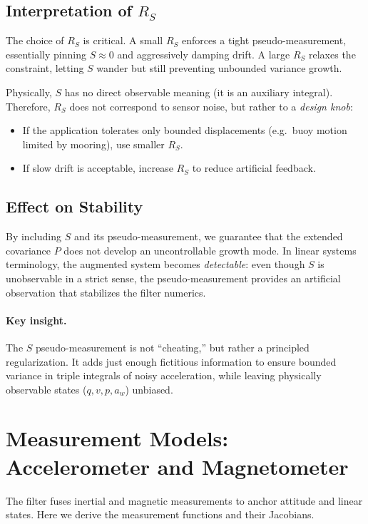\documentclass[11pt]{article}
\begin{document}
\subsection{Interpretation of $R_S$}
The choice of $R_S$ is critical. A small $R_S$ enforces a tight pseudo-measurement,
essentially pinning $S\approx 0$ and aggressively damping drift. A large $R_S$ relaxes
the constraint, letting $S$ wander but still preventing unbounded variance growth.

Physically, $S$ has no direct observable meaning (it is an auxiliary integral).
Therefore, $R_S$ does not correspond to sensor noise, but rather to a 
\emph{design knob}:
\begin{itemize}
\item If the application tolerates only bounded displacements (e.g.\ buoy motion limited
by mooring), use smaller $R_S$.
\item If slow drift is acceptable, increase $R_S$ to reduce artificial feedback.
\end{itemize}

\subsection{Effect on Stability}
By including $S$ and its pseudo-measurement, we guarantee that the extended covariance $P$
does not develop an uncontrollable growth mode. In linear systems terminology, the augmented
system becomes \emph{detectable}: even though $S$ is unobservable in a strict sense, the 
pseudo-measurement provides an artificial observation that stabilizes the filter numerics.

\paragraph{Key insight.} 
The $S$ pseudo-measurement is not “cheating,” but rather a principled
regularization. It adds just enough fictitious information to ensure 
bounded variance in triple integrals of noisy acceleration, 
while leaving physically observable states ($q,v,p,a_w$) unbiased.

\section{Measurement Models: Accelerometer and Magnetometer}
\label{sec:meas-models}

The filter fuses inertial and magnetic measurements to anchor attitude and
linear states. Here we derive the measurement functions and their Jacobians.
\end{document}
